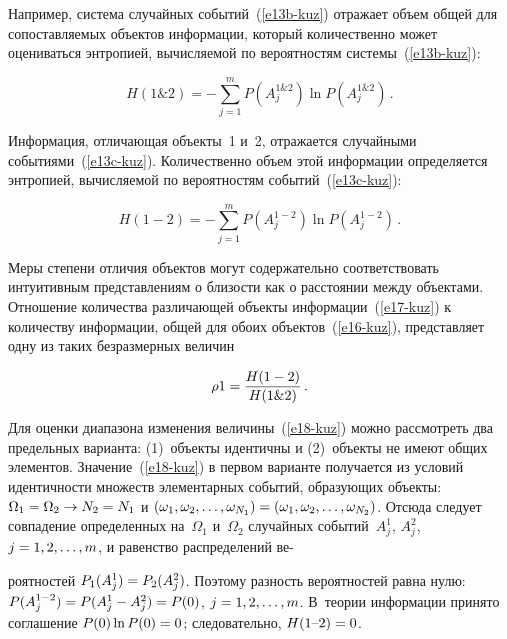 \begin{multicols}{2}
  Например, система случайных событий~(\ref{e13b-kuz}) отражает объем
общей для сопоставляемых объектов информации, который количественно
может оцениваться энтропией, вычисляемой по вероятностям
системы~(\ref{e13b-kuz}):

\noindent
  \begin{equation}
  H(1\&2) =-\sum\limits_{j=1}^m P(A_j^{1\&2}) \ln P(A_j^{1\&2})\,.
  \label{e16-kuz}
  \end{equation}

  Информация, отличающая объекты~1 и~2, отражается случайными
событиями~(\ref{e13c-kuz}). Количественно объем этой информации
определяется энтропией, вычисляемой по вероятностям
  событий~(\ref{e13c-kuz}):

  \noindent
  \begin{equation}
  H(1-2) =-\sum\limits_{j=1}^m P(A_j^{1-2}) \ln P(A_j^{1-2})\,.
  \label{e17-kuz}
  \end{equation}

  Меры степени отличия объектов могут содержательно соответствовать
интуитивным представлениям о близости как о расстоянии между объектами.
Отношение количества различающей объекты информации~(\ref{e17-kuz}) к
количеству информации, общей для обоих объектов~(\ref{e16-kuz}),
представляет одну из таких безразмерных величин

\noindent
  \begin{equation}
  \rho1 =\displaystyle\frac{\displaystyle  H(1-2) \mathstrut}{\displaystyle H(1\&2)\mathstrut}\,.
  \label{e18-kuz}
  \end{equation}

  Для оценки диапазона изменения величины~(\ref{e18-kuz}) можно
рассмотреть два предельных варианта: (1)~объекты идентичны и (2)~объекты не
имеют общих элементов. Значение~(\ref{e18-kuz}) в первом варианте
получается из условий идентичности множеств элементарных событий,
образующих объекты: $\Omega_1\hm= \Omega_2\hm\to N_2\hm=N_1$ и
$(\omega_1, \omega_2, \ldots , \omega_{N_1})\hm=(\omega_1, \omega_2, \ldots ,
\omega_{N_2})$. Отсюда следует совпадение определенных на~$\Omega_1$
и~$\Omega_2$ случайных событий~$A_j^1$, $A_j^2$, $j\hm=1, 2, \ldots , m$, и
равенство распределений ве-\linebreak\vspace*{-12pt}

\pagebreak

\noindent
роятностей $P_1(A_j^1)\hm= P_2(A_j^2)$. Поэтому
разность вероятностей равна нулю: $P(A_j^{1-2})\hm= P(A_j^1\hm-
A_j^2)\hm=P(0)$, $j \hm= 1,2, \ldots , m$. В~теории информации принято
соглашение $P(0) \ln P(0) \hm= 0$; следовательно, $H(1\mbox{--}2)\hm=0$.


\end{multicols}
